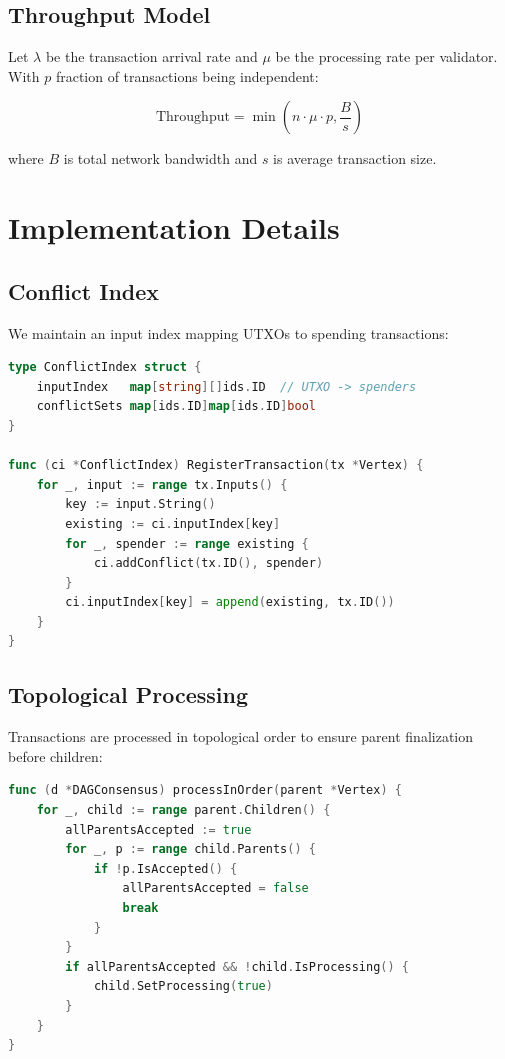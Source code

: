 \documentclass[11pt,a4paper]{article}
\begin{document}
\subsection{Throughput Model}

Let $\lambda$ be the transaction arrival rate and $\mu$ be the processing rate per validator. With $p$ fraction of transactions being independent:

\begin{equation}
\text{Throughput} = \min\left(n \cdot \mu \cdot p, \frac{B}{s}\right)
\end{equation}

where $B$ is total network bandwidth and $s$ is average transaction size.

\section{Implementation Details}

\subsection{Conflict Index}

We maintain an input index mapping UTXOs to spending transactions:

\begin{lstlisting}[language=Go,basicstyle=\small\ttfamily]
type ConflictIndex struct {
    inputIndex   map[string][]ids.ID  // UTXO -> spenders
    conflictSets map[ids.ID]map[ids.ID]bool
}

func (ci *ConflictIndex) RegisterTransaction(tx *Vertex) {
    for _, input := range tx.Inputs() {
        key := input.String()
        existing := ci.inputIndex[key]
        for _, spender := range existing {
            ci.addConflict(tx.ID(), spender)
        }
        ci.inputIndex[key] = append(existing, tx.ID())
    }
}
\end{lstlisting}

\subsection{Topological Processing}

Transactions are processed in topological order to ensure parent finalization before children:

\begin{lstlisting}[language=Go,basicstyle=\small\ttfamily]
func (d *DAGConsensus) processInOrder(parent *Vertex) {
    for _, child := range parent.Children() {
        allParentsAccepted := true
        for _, p := range child.Parents() {
            if !p.IsAccepted() {
                allParentsAccepted = false
                break
            }
        }
        if allParentsAccepted && !child.IsProcessing() {
            child.SetProcessing(true)
        }
    }
}
\end{lstlisting}
\end{document}

